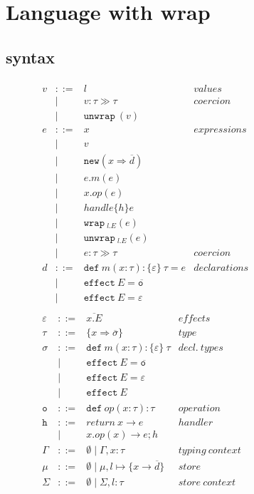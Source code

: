 \documentclass{article}
\newcommand{\keywadj}[1]{\mathtt{#1}}
\newcommand{\keyw}[1]{\keywadj{#1}~}
\begin{document}
\pagebreak
\section{Language with wrap}
\subsection{syntax}
\begin{figure}[H]
\small{
\[
\begin{array}{lll}
\begin{array}{lllr}
v & ::= & l & \mathit{values}\\
& | & v : \tau \gg \tau  & \mathit{coercion}\\
& | & \keyw{unwrap}(v) \\
e & ::= & x & \mathit{expressions}\\
& | & v \\
& | & \keywadj{new}(x \Rightarrow \overline{d}) \\
& | & e.m(e)\\
& | & x.op(e)\\
& | & handle \{ h \} e\\
& | & \keyw{wrap}_{l.E}(e) \\
& | & \keyw{unwrap}_{l.E}(e)\\
& | & e : \tau \gg \tau & \mathit{ coercion}\\
d & ::= & \keyw{def} m(x : \tau) :  \{\varepsilon\} ~\tau = e &
\mathit{declarations}\\
& |   & \keyw{effect} E = \overline{\keyw{o}} \\
& |   & \keyw{effect} E = \varepsilon \\


\end{array}
\begin{array}{lllr}


\varepsilon & ::= & \overline{x.E} & \mathit{effects}\\
\tau & ::= & \{ x \Rightarrow \overline{\sigma} \} & \mathit{type}\\
\sigma & ::= & \keyw{def} m(x : \tau) : \{\varepsilon\} ~\tau & \mathit{decl.~types}\\
       & |   & \keyw{effect} E = \overline{\keyw{o}}\\
       & |   & \keyw{effect} E = \varepsilon\\
       & |   & \keyw{effect} E \\
\keyw{o} & ::= & \keyw{def} op(x:\tau):  \tau & \mathit{operation}\\
\keyw{h} & ::= & return\ x \rightarrow e & \mathit{handler}\\
& | & x.op(x) \rightarrow e; h \\
\Gamma & ::= & \emptyset \mid \Gamma, x:\tau & \mathit{typing\ context}\\
\mu & ::= & \emptyset \mid \mu, l \mapsto \{x \rightarrow \overline{d}\} & \mathit{store}\\
\Sigma & ::= & \emptyset \mid \Sigma, l : \tau & \mathit{store\ context}\\



\end{array}
\end{array}\]}
\end{figure}
\end{document}
